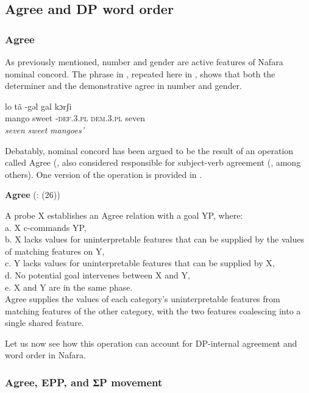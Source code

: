 \documentclass[output=paper]{langscibook}
\begin{document}
\subsection{Agree and DP word order}
\label{sec:baron:2.3}
\subsubsection{Agree}

As previously mentioned, number and gender are active features of Nafara nominal concord. The phrase in , repeated here in , shows that both the determiner and the demonstrative agree in number and gender. 


\ea\label{ex:baron:17}
lo tã -gəl gal kɔrʃi\\
   mango sweet -\textsc{def.3.pl} \textsc{dem.3.pl} seven\\
 \textit{seven} \textit{sweet} \textit{mangoes’}
\z

Debatably, nominal concord has been argued to be the result of an operation called Agree (\citealt{Chomsky2000,Chomsky2001}, also considered responsible for subject-verb agreement (\citealt{Baker2008,Carstens2001,Collins2004}, among others). One version of the operation is provided in .


\ea\label{ex:baron:18}
\textbf{Agree}            (\citealt{Norris2014}: (26))

A probe X establishes an Agree relation with a goal YP, where: \\
a. X c-commands YP,\\
b. X lacks values for uninterpretable features that can be supplied by the values of  matching features on Y, \\
c. Y lacks values for uninterpretable features that can be supplied by X, \\
d. No potential goal intervenes between X and Y, \\
e. X and Y are in the same phase. \\
Agree supplies the values of each category’s uninterpretable features from matching features of the other category, with the two features coalescing into a single shared feature.
\z


Let us now see how this operation can account for DP-internal agreement and word order in Nafara.


\subsubsection{Agree, EPP, and ƩP movement}
\end{document}
